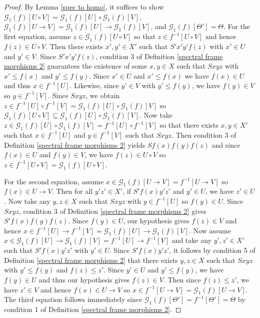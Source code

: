 \documentclass{amsart}
\theoremstyle{plain}
\theoremstyle{definition}
\begin{document}
\begin{proof}
  By Lemma \ref{spec to homo}, it suffices to show    $\mathcal{G}_1(f)[U\circ V]=\mathcal{G}_1(f)[U]\circ\mathcal{G}_1(f)[V]$, $\mathcal{G}_1(f)[U\rightarrow V]=\mathcal{G}_1(f)[U]\rightarrow\mathcal{G}_1(f)[V]$, and $\mathcal{G}_1(f)[\Theta']=\Theta$. For the first equation, assume $z\in\mathcal{G}_1(f)[U\circ V]$ so that $z\in f^{-1}[U\circ V]$ and hence $f(z)\in U\circ V$. Then there exists $x',y'\in X'$ such that $S'x'y'f(z)$ with $x'\in U$ and $y'\in V$. Since $S'x'y'f(z)$, condition 3 of Definition \ref{spectral frame morphisms 2} guarantees the existence of some $x,y\in X$ such that $Sxyz$ with $x'\leqslant f(x)$ and $y'\leqslant f(y)$. Since $x'\in U$ and $x'\leqslant f(x)$ we have $f(x)\in U$ and thus $x\in f^{-1}[U]$. Likewise, since $y'\in V$ with $y'\leqslant f(y)$, we have $f(y)\in V$ so $y\in f^{-1}[V]$. Since $Sxyz$, we obtain $z\in f^{-1}[U]\circ f^{-1}[V]=\mathcal{G}_1(f)[U]\circ\mathcal{G}_1(f)[V]$ so $\mathcal{G}_1(f)[U\circ V]\subseteq\mathcal{G}_1(f)[U]\circ\mathcal{G}_1(f)[V]$. Now take $z\in\mathcal{G}_1(f)[U]\circ\mathcal{G}_1(f)[V]=f^{-1}[U]\circ f^{-1}[V]$ so that there exists $x,y\in X'$ such that $x\in f^{-1}[U]$ and $y\in f^{-1}[V]$ such that $Sxyz$. Then condition 3 of Definition \ref{spectral frame morphisms 2} yields $Sf(x)f(y)f(z)$ and since $f(x)\in U$ and $f(y)\in V$, we have $f(z)\in U\circ V$ so $z\in f^{-1}[U\circ V]=\mathcal{G}_1(f)[U\circ V]$. 



For the second equation, assume $x\in\mathcal{G}_1(f)[U\rightarrow V]=f^{-1}[U\rightarrow V]$ so $f(x)\in U\rightarrow V$. Then for all $y'z'\in X'$, if $S'f(x)y'z'$ and $y'\in U$, we have $z'\in U$. Now take any $y,z\in X$ such that $Sxyz$ with $y\in f^{-1}[U]$ so $f(y)\in U$. Since $Sxyz$, condition 3 of Definition \ref{spectral frame morphisms 2} gives $S'f(x)f(y)f(z)$. Since $f(y)\in U$, our hypothesis gives $f(z)\in V$ and hence $x\in f^{-1}[U]\rightarrow f^{-1}[V]=\mathcal{G}_1(f)[U]\rightarrow\mathcal{G}_1(f)[V]$. Now assume $x\in\mathcal{G}_1(f)[U]\rightarrow\mathcal{G}_1(f)[V]=f^{-1}[U]\rightarrow f^{-1}[V]$ and take any $y',z'\in X'$ such that $S'f(x)y'z'$ with $y'\in U$. Since $S'f(x)y'z'$, it follows by condition 5 of Definition \ref{spectral frame morphisms 2} that there exists $y,z\in X$ such that $Sxyz$ with $y'\leqslant f(y)$ and $f(z)\leqslant z'$. Since $y'\in U$ and $y'\leqslant f(y)$, we have $f(y)\in U$ and thus our hypothesis gives $f(z)\in V$. Then since $f(z)\leqslant z'$, we have $z'\in V$ and hence $f(x)\in U\rightarrow V$ so $x\in f^{-1}[U\rightarrow V]=\mathcal{G}_1(f)[U\rightarrow V]$. The third equation follows immediately since $\mathcal{G}_1(f)[\Theta']=f^{-1}[\Theta']=\Theta$ by condition 1 of Definition \ref{spectral frame morphisms 2}. 
\end{proof}
\end{document}
